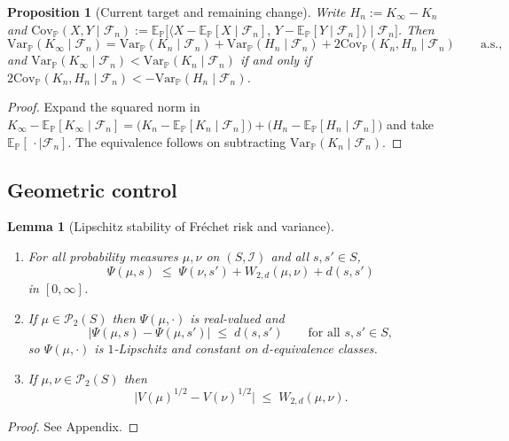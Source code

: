\documentclass{article}
\newcommand{\Var}{\mathrm{Var}_{\mathbb{P}}}
\newcommand{\Cov}{\mathrm{Cov}_{\mathbb{P}}}
\newcommand{\E}{\mathbb{E}_{\mathbb{P}}}
\newcommand{\F}{\mathcal{F}}
\newcommand{\I}{\mathcal{I}}
\newcommand{\1}{\mathbbm{1}}
\newtheorem{prop}{Proposition}
\newtheorem{lemma}{Lemma}
\begin{document}
\begin{prop}[Current target and remaining change]
\label{currentremaining}
Write $H_n:=K_\infty-K_n$ and
$\Cov(X,Y\mid\F_n):=\E\big[\langle X-\E[X\mid\F_n],\,Y-\E[Y\mid\F_n]\rangle\mid\F_n\big]$. Then
\[
\Var(K_\infty\mid\F_n)=\Var(K_n\mid\F_n)+\Var(H_n\mid\F_n)+2\Cov(K_n,H_n\mid\F_n)
\qquad\text{a.s.},
\]
and $\Var(K_\infty\mid\F_n)<\Var(K_n\mid\F_n)$ if and only if
$2\Cov(K_n,H_n\mid\F_n)<-\Var(H_n\mid\F_n)$.
\end{prop}

\begin{proof}
Expand the squared norm in
$K_\infty-\E[K_\infty\mid\F_n]=\big(K_n-\E[K_n\mid\F_n]\big)+\big(H_n-\E[H_n\mid\F_n]\big)$ and take
$\E[\,\cdot\mid\F_n]$. The equivalence follows on subtracting $\Var(K_n\mid\F_n)$.
\end{proof}

\subsection{Geometric control}

\begin{lemma}[Lipschitz stability of Fr\'echet risk and variance]
\label{psilip}
\begin{enumerate}
\item[(i)] For all probability measures $\mu,\nu$ on $(S,\I)$ and all $s,s'\in S$,
\begin{equation}\label{eq:psilip}
\Psi(\mu,s)\;\le\;\Psi(\nu,s')+W_{2,d}(\mu,\nu)+d(s,s')
\end{equation}
in $[0,\infty]$.
\item[(ii)] If $\mu\in\mathcal{P}_2(S)$ then $\Psi(\mu,\cdot)$ is real-valued and
\[
\big|\Psi(\mu,s)-\Psi(\mu,s')\big|\;\le\;d(s,s')\qquad\text{for all }s,s'\in S,
\]
so $\Psi(\mu,\cdot)$ is $1$-Lipschitz and constant on $d$-equivalence classes.
\item[(iii)] If $\mu,\nu\in\mathcal{P}_2(S)$ then
\[
\big|V(\mu)^{1/2}-V(\nu)^{1/2}\big|\;\le\;W_{2,d}(\mu,\nu).
\]
\end{enumerate}
\end{lemma}

\begin{proof}
See Appendix.
\end{proof}
\end{document}
